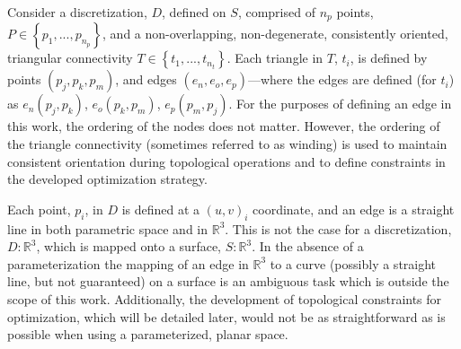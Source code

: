 Consider a discretization, $D$, defined on $S$, comprised of $n_p$
points, $P \in \left\{p_1,...,p_{n_p} \right\}$, and a non-overlapping,
non-degenerate, consistently oriented, triangular connectivity $T \in
\left\{t_1,...,t_{n_t} \right\}$. Each triangle in $T$, $t_i$, is
defined by points $\left(p_j, p_k, p_m\right)$, and edges $\left(e_n,
e_o, e_p\right)$---where the edges are defined (for $t_i$) as $e_n
\left(p_j, p_k\right)$, $e_o \left(p_k, p_m\right)$, $e_p \left(p_m,
p_j\right)$. For the purposes of defining an edge in this work, the
ordering of the nodes does not matter. However, the ordering of the
triangle connectivity (sometimes referred to as winding) is used to
maintain consistent orientation during topological operations and to
define constraints in the developed optimization strategy.

Each point, $p_i$, in $D$ is defined at a $\left(u,v\right)_i$
coordinate, and an edge is a straight line in both parametric space and in
${\mathbb R}^3$. This is not the case for a discretization, $D:{\mathbb
R}^3$, which is mapped onto a surface, $S:{\mathbb R}^3$. In the absence
of a parameterization the mapping of an edge in ${\mathbb R}^3$ to a
curve (possibly a straight line, but not guaranteed) on a surface is an
ambiguous task which is outside the scope of this work. Additionally,
the development of topological constraints for optimization, which will
be detailed later, would not be as straightforward as is possible when
using a parameterized, planar space.

